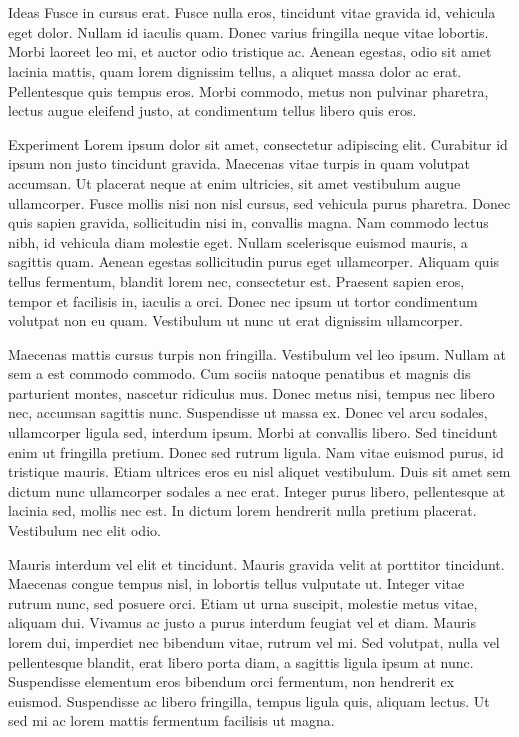 \documentclass[12pt]{beamer}
\renewcommand{\maketitle}{%
	\begin{center}%
		\Huge\inserttitle\\[5mm]%
		\Large\insertauthor\\[5mm]%
		\Large\insertinstitute%
	\end{center}%
	\vspace*{-1ex}%
}
\begin{document}
\begin{frame}{\maketitle}
\begin{columns}
\begin{column}{.45\textwidth}
\begin{block}{Ideas}
					Fusce in cursus erat. Fusce nulla eros, tincidunt vitae gravida id, vehicula eget dolor. Nullam id iaculis quam. Donec varius fringilla neque vitae lobortis. Morbi laoreet leo mi, et auctor odio tristique ac. Aenean egestas, odio sit amet lacinia mattis, quam lorem dignissim tellus, a aliquet massa dolor ac erat. Pellentesque quis tempus eros. Morbi commodo, metus non pulvinar pharetra, lectus augue eleifend justo, at condimentum tellus libero quis eros.
				\end{block}
				\vspace{1em}
				\begin{block}{Experiment}
					Lorem ipsum dolor sit amet, consectetur adipiscing elit. Curabitur id ipsum non justo tincidunt gravida. Maecenas vitae turpis in quam volutpat accumsan. Ut placerat neque at enim ultricies, sit amet vestibulum augue ullamcorper. Fusce mollis nisi non nisl cursus, sed vehicula purus pharetra. Donec quis sapien gravida, sollicitudin nisi in, convallis magna. Nam commodo lectus nibh, id vehicula diam molestie eget. Nullam scelerisque euismod mauris, a sagittis quam. Aenean egestas sollicitudin purus eget ullamcorper. Aliquam quis tellus fermentum, blandit lorem nec, consectetur est. Praesent sapien eros, tempor et facilisis in, iaculis a orci. Donec nec ipsum ut tortor condimentum volutpat non eu quam. Vestibulum ut nunc ut erat dignissim ullamcorper.

					Maecenas mattis cursus turpis non fringilla. Vestibulum vel leo ipsum. Nullam at sem a est commodo commodo. Cum sociis natoque penatibus et magnis dis parturient montes, nascetur ridiculus mus. Donec metus nisi, tempus nec libero nec, accumsan sagittis nunc. Suspendisse ut massa ex. Donec vel arcu sodales, ullamcorper ligula sed, interdum ipsum. Morbi at convallis libero. Sed tincidunt enim ut fringilla pretium. Donec sed rutrum ligula. Nam vitae euismod purus, id tristique mauris. Etiam ultrices eros eu nisl aliquet vestibulum. Duis sit amet sem dictum nunc ullamcorper sodales a nec erat. Integer purus libero, pellentesque at lacinia sed, mollis nec est. In dictum lorem hendrerit nulla pretium placerat. Vestibulum nec elit odio.

					Mauris interdum vel elit et tincidunt. Mauris gravida velit at porttitor tincidunt. Maecenas congue tempus nisl, in lobortis tellus vulputate ut. Integer vitae rutrum nunc, sed posuere orci. Etiam ut urna suscipit, molestie metus vitae, aliquam dui. Vivamus ac justo a purus interdum feugiat vel et diam. Mauris lorem dui, imperdiet nec bibendum vitae, rutrum vel mi. Sed volutpat, nulla vel pellentesque blandit, erat libero porta diam, a sagittis ligula ipsum at nunc. Suspendisse elementum eros bibendum orci fermentum, non hendrerit ex euismod. Suspendisse ac libero fringilla, tempus ligula quis, aliquam lectus. Ut sed mi ac lorem mattis fermentum facilisis ut magna.


\end{block}
\end{column}
\end{columns}
\end{frame}
\end{document}
